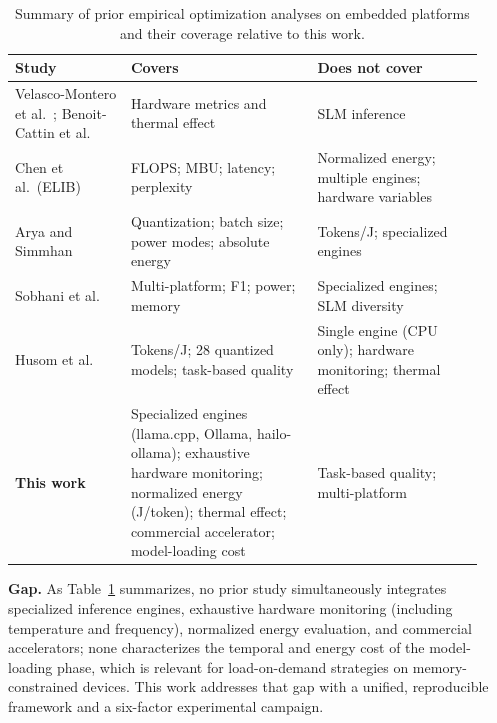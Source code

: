 \documentclass[acmsmall,natbib=false]{acmart}
\begin{document}
\begin{table}[t]
\centering
\caption{Summary of prior empirical optimization analyses on embedded
platforms and their coverage relative to this work.}
\label{tab:related}
\footnotesize
\renewcommand{\arraystretch}{1.15}
\begin{tabular}{@{}p{0.23\linewidth} p{0.37\linewidth} p{0.33\linewidth}@{}}
\toprule
\textbf{Study} & \textbf{Covers} & \textbf{Does not cover} \\
\midrule
Velasco-Montero et al.~\cite{velasco-montero_optimal_2022,
velasco-montero_relevant_2022}; Benoit-Cattin et
al.~\cite{benoit-cattin_impact_2020} &
Hardware metrics and thermal effect &
SLM inference \\
\addlinespace[2pt]
Chen et al.\ (ELIB)~\cite{chen_inference_2025} &
FLOPS; MBU; latency; perplexity &
Normalized energy; multiple engines; hardware variables \\
\addlinespace[2pt]
Arya and Simmhan~\cite{11105796} &
Quantization; batch size; power modes; absolute energy &
Tokens/J; specialized engines \\
\addlinespace[2pt]
Sobhani et al.~\cite{sobhani_sustainability_2025} &
Multi-platform; F1; power; memory &
Specialized engines; SLM diversity \\
\addlinespace[2pt]
Husom et al.~\cite{husom_sustainable_2025} &
Tokens/J; 28 quantized models; task-based quality &
Single engine (CPU only); hardware monitoring; thermal effect \\
\midrule
\textbf{This work} &
Specialized engines (llama.cpp, Ollama, hailo-ollama); exhaustive hardware
monitoring; normalized energy (J/token); thermal effect; commercial
accelerator; model-loading cost &
Task-based quality; multi-platform \\
\bottomrule
\end{tabular}
\end{table}

\textbf{Gap.} As Table~\ref{tab:related} summarizes, no prior study
simultaneously integrates specialized inference engines, exhaustive hardware
monitoring (including temperature and frequency), normalized energy
evaluation, and commercial accelerators; none characterizes the temporal and
energy cost of the model-loading phase, which is relevant for load-on-demand
strategies on memory-constrained devices. This work addresses that gap with
a unified, reproducible framework and a six-factor experimental campaign.

\end{document}

